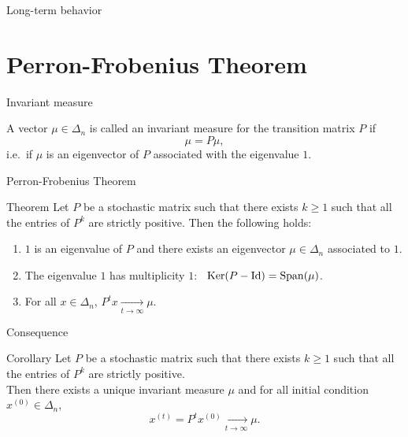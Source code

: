 \documentclass{beamer}
\begin{document}
\begin{frame}[t]{Long-term behavior}
	\grid


\end{frame}

\section{Perron-Frobenius Theorem}

\begin{frame}[t]{Invariant measure}
	\grid

	\vspace{0.2cm}
	\begin{definition}
		A vector $\mu \in \Delta_n$ is called an invariant measure for the transition matrix $P$ if 
		$$
		\mu = P \mu,
		$$
		i.e.\ if $\mu$ is an eigenvector of $P$ associated with the eigenvalue $1$.
	\end{definition}


\end{frame}

\begin{frame}[t]{Perron-Frobenius Theorem}
	\grid
	\begin{block}{Theorem}
		Let $P$ be a stochastic matrix such that there exists $k \geq 1$ such that all the entries of $P^k$ are strictly positive. Then the following holds:
		\begin{enumerate}
			\vspace{0.3cm}
		\item $1$ is an eigenvalue of $P$ and there exists an eigenvector $\mu \in \Delta_n$ associated to $1$.
			\vspace{0.3cm}
		\item The eigenvalue $1$ has multiplicity $1$: \ ${{\rm Ker}}(P-{{\rm Id}}) = {{\rm Span}}(\mu)$.
			\vspace{0.3cm}
		\item For all $x \in \Delta_n$, $P^t x \xrightarrow[t \to \infty]{} \mu$.
	\end{enumerate}
\end{block}
\end{frame}


\begin{frame}[t]{Consequence}
	\grid
	\begin{block}{Corollary}
		Let $P$ be a stochastic matrix such that there exists $k \geq 1$ such that all the entries of $P^k$ are strictly positive. 
		\\

		Then there exists a unique invariant measure $\mu$ and for all initial condition $x^{(0)} \in \Delta_n$,
		$$
		x^{(t)} = P^t x^{(0)} \xrightarrow[t \to \infty]{} \mu.
		$$
	\end{block}
\end{frame}
\end{document}
